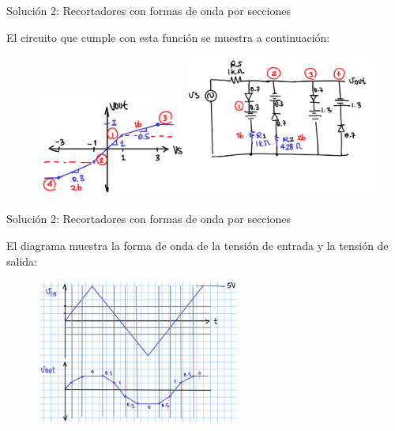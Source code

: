 \documentclass[t,aspectratio=169]{beamer}
\begin{document}
\begin{frame}{Solución 2: Recortadores con formas de onda por secciones}

El circuito que cumple con esta función se muestra a continuación:

\begin{figure}
    \centering
    \includegraphics[width=0.45\textwidth]{figures/recortador_ejemplo_2.png}\includegraphics[width=0.55\textwidth]{figures/recortador_solucion_2.png}
\end{figure}

\end{frame}


\begin{frame}{Solución 2: Recortadores con formas de onda por secciones}

El diagrama muestra la forma de onda de la tensión de entrada y la tensión de salida:

\begin{figure}
    \centering
    \includegraphics[width=0.6\textwidth]{figures/recortador_solucion_2b.png}
\end{figure}

\end{frame}
\end{document}
